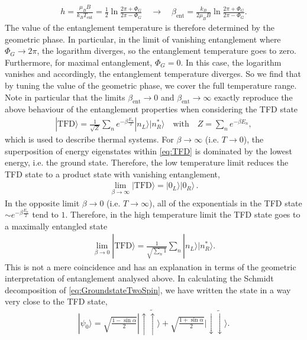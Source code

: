 \documentclass[a4paper,11pt]{article}
\newcommand{\1}{\mathds{1}}
\newcommand{\tfd}{\text{TFD}}
\begin{document}
\begin{align}
    h=\frac{\mu_BB}{k_BT_{\text{ent}}}=\frac{1}{2}\ln\frac{2\pi+\Phi_G}{2\pi-\Phi_G}\quad\to\quad\beta_{\text{ent}}=\frac{k_B}{2\mu_BB}\ln\frac{2\pi+\Phi_G}{2\pi-\Phi_G}.\label{eq:EntanglementTemperature}
\end{align}
The value of the entanglement temperature is therefore determined by the geometric phase. In particular, in the limit of vanishing entanglement where $\Phi_G\to2\pi$, the logarithm diverges, so the entanglement temperature goes to zero. Furthermore, for maximal entanglement, $\Phi_G=0$. In this case, the logarithm vanishes and accordingly, the entanglement temperature diverges. So we find that by tuning the value of the geometric phase, we cover the full temperature range. Note in particular that the limits $\beta_{\text{ent}}\to0$ and $\beta_{\text{ent}}\to\infty$ exactly reproduce the above behaviour of the entanglement properties when considering the TFD state
\begin{align}
    |\tfd\rangle=\frac{1}{\sqrt{Z}}\sum_ne^{-\beta\frac{E_n}{2}}|n_L\rangle|n_R^\ast\rangle\quad\text{with}\quad Z=\sum_ne^{-\beta E_n},\label{eq:TFD}
\end{align}
which is used to describe thermal systems. For $\beta\to\infty$ (i.e. $T\to0$), the superposition of energy eigenstates within \eqref{eq:TFD} is dominated by the lowest energy, i.e. the ground state. Therefore, the low temperature limit reduces the TFD state to a product state with vanishing entanglement,
\begin{align}
    \lim\limits_{\beta\to\infty}|\tfd\rangle=|0_L\rangle|0_R\rangle\,.\label{eq:TFDLimitLowTemperature}
\end{align}
In the opposite limit $\beta\to0$ (i.e. $T\to\infty$), all of the exponentials in the TFD state $\sim e^{-\beta\frac{E_n}{2}}$ tend to $1$. Therefore, in the high temperature limit the TFD state goes to a maximally entangled state
\begin{align}
    \lim\limits_{\beta\to0}|\tfd\rangle=\frac{1}{\sqrt{\sum_n1}}\sum_n|n_L\rangle|n_R^\ast\rangle.\label{eq:TFDLimitHighTemperature}
\end{align}
This is not a mere coincidence and has an explanation in terms of the geometric interpretation of entanglement analysed above. In calculating the Schmidt decomposition of \eqref{eq:GroundstateTwoSpin}, we have written the state in a way very close to the TFD state,
\begin{align}
    |\psi_0\rangle=\sqrt{\frac{1-\sin\alpha}{2}}|\!\uparrow\!\tilde{\uparrow}\rangle+\sqrt{\frac{1+\sin\alpha}{2}}|\!\downarrow\!\tilde{\downarrow}\rangle.
\end{align}
\end{document}
